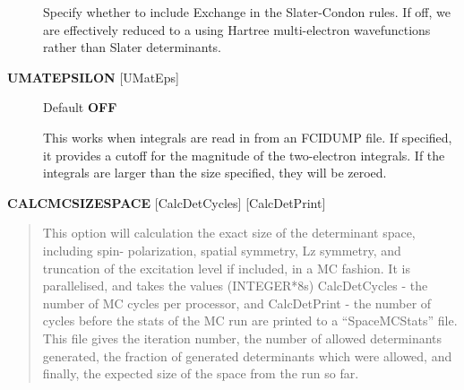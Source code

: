 \documentclass[openany,a4paper,10pt,english]{manual}
\begin{document}
\begin{description}
Specify whether to include Exchange in the Slater-Condon rules.
If off, we are effectively reduced to a using Hartree multi-electron
wavefunctions rather than Slater determinants.

\item[\textbf{UMATEPSILON} {[}UMatEps{]}] \leavevmode
Default \textbf{OFF}

This works when integrals are read in from an FCIDUMP file. If specified, it provides
a cutoff for the magnitude of the two-electron integrals. If the integrals are larger
than the size specified, they will be zeroed.

\end{description}

\textbf{CALCMCSIZESPACE} {[}CalcDetCycles{]} {[}CalcDetPrint{]}
\begin{quote}

This option will calculation the exact size of the determinant space, including spin-
polarization, spatial symmetry, Lz symmetry, and truncation of the excitation level if
included, in a MC fashion. It is parallelised, and takes the values (INTEGER*8s) CalcDetCycles
- the number of MC cycles per processor, and CalcDetPrint - the number of cycles before
the stats of the MC run are printed to a ``SpaceMCStats'' file. This file gives the iteration
number, the number of allowed determinants generated, the fraction of generated determinants
which were allowed, and finally, the expected size of the space from the run so far.
\end{quote}
\end{document}
